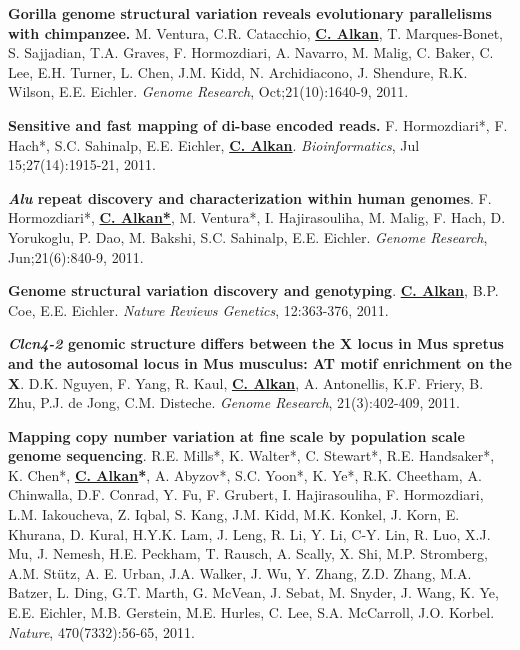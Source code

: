 \vspace{-.2cm}
{\bf Gorilla genome structural variation reveals evolutionary parallelisms with chimpanzee.}
M. Ventura, C.R. Catacchio, {\bf {\underline {C. Alkan}}}, T. Marques-Bonet, S. Sajjadian, T.A. Graves, F. Hormozdiari, A. Navarro, 
M. Malig, C. Baker, C. Lee, E.H. Turner, L. Chen, J.M. Kidd, N. Archidiacono, J. Shendure, R.K. Wilson, E.E. Eichler.
{\em Genome Research}, Oct;21(10):1640-9, 2011.


\vspace{-.2cm}
{\bf Sensitive and fast mapping of di-base encoded reads.}
F. Hormozdiari*, F. Hach*, S.C. Sahinalp, E.E. Eichler, {\bf {\underline {C. Alkan}}}.
{\em Bioinformatics}, Jul 15;27(14):1915-21, 2011.



\vspace{-.2cm}
{\bf \textit {Alu} repeat discovery and characterization within human genomes}.
F. Hormozdiari*, {\bf {\underline {C. Alkan*}}}, M. Ventura*, I. Hajirasouliha, M. Malig, 
F. Hach, D. Yorukoglu, P. Dao, M. Bakshi, S.C. Sahinalp, E.E. Eichler.
{\em Genome Research}, Jun;21(6):840-9, 2011.

\vspace{-.2cm}
{\bf Genome structural variation discovery and genotyping}. 
{\bf {\underline {C. Alkan}}}, B.P. Coe, E.E. Eichler.
{\em Nature Reviews Genetics}, 12:363-376, 2011.

\clearpage
\vspace{-.2cm}
{\bf {\em Clcn4-2} genomic structure differs between the X locus in Mus spretus and the autosomal 
locus in Mus musculus: AT motif enrichment on the X}.  
D.K. Nguyen, F. Yang, R. Kaul, {\bf {\underline {C. Alkan}}}, A. Antonellis, K.F. Friery, 
B. Zhu, P.J. de Jong, C.M. Disteche. 
{\em Genome Research}, 21(3):402-409, 2011.


\vspace{-.2cm}
{\bf Mapping copy number variation at fine scale by population scale genome sequencing}.
R.E. Mills*, K. Walter*, C. Stewart*, R.E. Handsaker*, K. Chen*, 
{\bf {\underline {C. Alkan}*}}, A. Abyzov*, S.C. Yoon*, K. Ye*, R.K. Cheetham, 
A. Chinwalla, D.F. Conrad, Y. Fu, F. Grubert, I. Hajirasouliha, 
F. Hormozdiari, L.M. Iakoucheva, Z. Iqbal, S. Kang, J.M. Kidd, 
M.K. Konkel, J. Korn, E. Khurana, D. Kural, H.Y.K. Lam, J. Leng, 
R. Li, Y. Li, C-Y. Lin, R. Luo, X.J. Mu, J. Nemesh,
H.E. Peckham, T. Rausch, A. Scally, X. Shi, M.P. Stromberg, 
A.M. St\"{u}tz, A. E. Urban, J.A. Walker, J. Wu, Y. Zhang, 
Z.D. Zhang, M.A. Batzer, L. Ding, G.T. Marth, G. McVean, 
J. Sebat, M. Snyder, J. Wang, K. Ye, E.E. Eichler, 
M.B. Gerstein, M.E. Hurles, C. Lee, S.A. McCarroll,  J.O. Korbel.
{\em Nature}, 470(7332):56-65, 2011.


